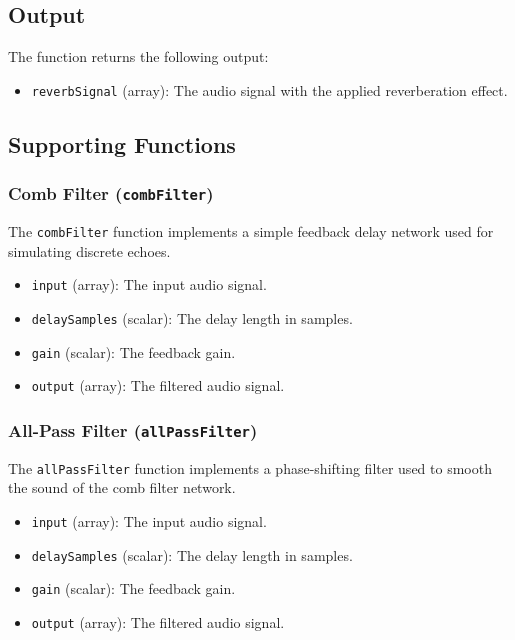 \documentclass{article}
\begin{document}
\subsection{Output}
The function returns the following output:
\begin{itemize}
    \item \texttt{reverbSignal} (array): The audio signal with the applied reverberation effect.
\end{itemize}

\subsection{Supporting Functions}
\subsubsection{Comb Filter (\texttt{combFilter})}
The \texttt{combFilter} function implements a simple feedback delay network used for simulating discrete echoes.
\begin{itemize}
    \item \texttt{input} (array): The input audio signal.
    \item \texttt{delaySamples} (scalar): The delay length in samples.
    \item \texttt{gain} (scalar): The feedback gain.
    \item \texttt{output} (array): The filtered audio signal.
\end{itemize}

\subsubsection{All-Pass Filter (\texttt{allPassFilter})}
The \texttt{allPassFilter} function implements a phase-shifting filter used to smooth the sound of the comb filter network.
\begin{itemize}
    \item \texttt{input} (array): The input audio signal.
    \item \texttt{delaySamples} (scalar): The delay length in samples.
    \item \texttt{gain} (scalar): The feedback gain.
    \item \texttt{output} (array): The filtered audio signal.
\end{itemize}
\end{document}
